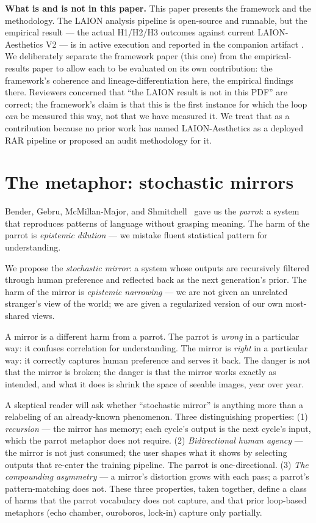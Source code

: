 \documentclass[sigconf,nonacm]{acmart}
\begin{document}
\textbf{What is and is not in this paper.} This paper presents the framework and the methodology. The LAION analysis pipeline is open-source and runnable, but the empirical result --- the actual H1/H2/H3 outcomes against current LAION-Aesthetics V2 ---  is in active execution and reported in the companion artifact \cite{anonCompanion}. We deliberately separate the framework paper (this one) from the empirical-results paper to allow each to be evaluated on its own contribution: the framework's coherence and lineage-differentiation here, the empirical findings there. Reviewers concerned that ``the LAION result is not in this PDF'' are correct; the framework's claim is that this is the first instance for which the loop \emph{can} be measured this way, not that we have measured it. We treat that as a contribution because no prior work has named LAION-Aesthetics as a deployed RAR pipeline or proposed an audit methodology for it.

\section{The metaphor: stochastic mirrors}

Bender, Gebru, McMillan-Major, and Shmitchell~\cite{bender2021dangers} gave us the \emph{parrot}: a system that reproduces patterns of language without grasping meaning. The harm of the parrot is \emph{epistemic dilution} --- we mistake fluent statistical pattern for understanding.

We propose the \emph{stochastic mirror}: a system whose outputs are recursively filtered through human preference and reflected back as the next generation's prior. The harm of the mirror is \emph{epistemic narrowing} --- we are not given an unrelated stranger's view of the world; we are given a regularized version of our own most-shared views.

A mirror is a different harm from a parrot. The parrot is \emph{wrong} in a particular way: it confuses correlation for understanding. The mirror is \emph{right} in a particular way: it correctly captures human preference and serves it back. The danger is not that the mirror is broken; the danger is that the mirror works exactly as intended, and what it does is shrink the space of seeable images, year over year.

A skeptical reader will ask whether ``stochastic mirror'' is anything more than a relabeling of an already-known phenomenon. Three distinguishing properties: (1) \emph{recursion} --- the mirror has memory; each cycle's output is the next cycle's input, which the parrot metaphor does not require. (2) \emph{Bidirectional human agency} --- the mirror is not just consumed; the user shapes what it shows by selecting outputs that re-enter the training pipeline. The parrot is one-directional. (3) \emph{The compounding asymmetry} --- a mirror's distortion grows with each pass; a parrot's pattern-matching does not. These three properties, taken together, define a class of harms that the parrot vocabulary does not capture, and that prior loop-based metaphors (echo chamber, ouroboros, lock-in) capture only partially.
\end{document}
